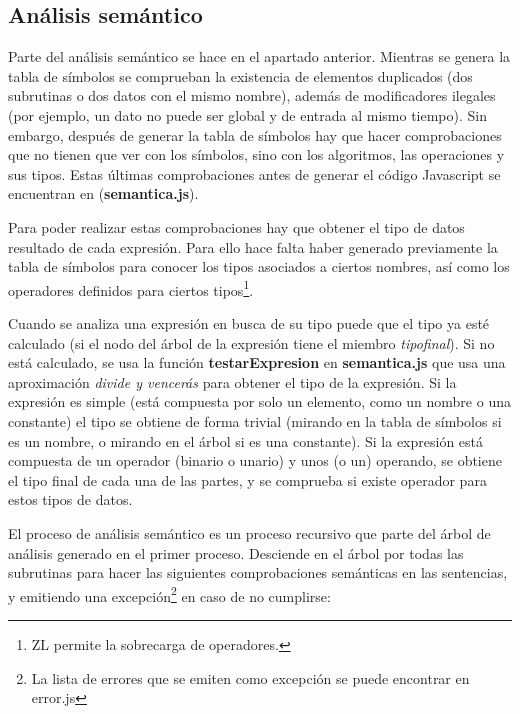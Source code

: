 \documentclass{report}
\begin{document}
	\subsection{Análisis semántico}
	
	Parte del análisis semántico se hace en el apartado anterior. Mientras se genera la tabla de símbolos se comprueban la existencia de elementos duplicados (dos subrutinas o dos datos con el mismo nombre), además de modificadores ilegales (por ejemplo, un dato no puede ser global y de entrada al mismo tiempo). Sin embargo, después de generar la tabla de símbolos hay que hacer comprobaciones que no tienen que ver con los símbolos, sino con los algoritmos, las operaciones y sus tipos. Estas últimas comprobaciones antes de generar el código Javascript se encuentran en (\textbf{semantica.js}). 
	
	\vspace{10px}
	
	Para poder realizar estas comprobaciones hay que obtener el tipo de datos resultado de cada expresión. Para ello hace falta haber generado previamente la tabla de símbolos para conocer los tipos asociados a ciertos nombres, así como los operadores definidos para ciertos tipos\footnote{ZL permite la sobrecarga de operadores.}.
	
	\vspace{10px}
	
	Cuando se analiza una expresión en busca de su tipo puede que el tipo ya esté calculado (si el nodo del árbol de la expresión tiene el miembro \textit{tipofinal}). Si no está calculado, se usa la función \textbf{testarExpresion} en \textbf{semantica.js} que usa una aproximación \textit{divide y vencerás} para obtener el tipo de la expresión. Si la expresión es simple (está compuesta por solo un elemento, como un nombre o una constante) el tipo se obtiene de forma trivial (mirando en la tabla de símbolos si es un nombre, o mirando en el árbol si es una constante). Si la expresión está compuesta de un operador (binario o unario) y unos (o un) operando, se obtiene el tipo final de cada una de las partes, y se comprueba si existe operador para estos tipos de datos.

	\vspace{10px}
	
	El proceso de análisis semántico es un proceso recursivo que parte del árbol de análisis generado en el primer proceso. Desciende en el árbol por todas las subrutinas para hacer las siguientes comprobaciones semánticas en las sentencias, y emitiendo una excepción\footnote{La lista de errores que se emiten como excepción se puede encontrar en error.js} en caso de no cumplirse:
	
\end{document}
